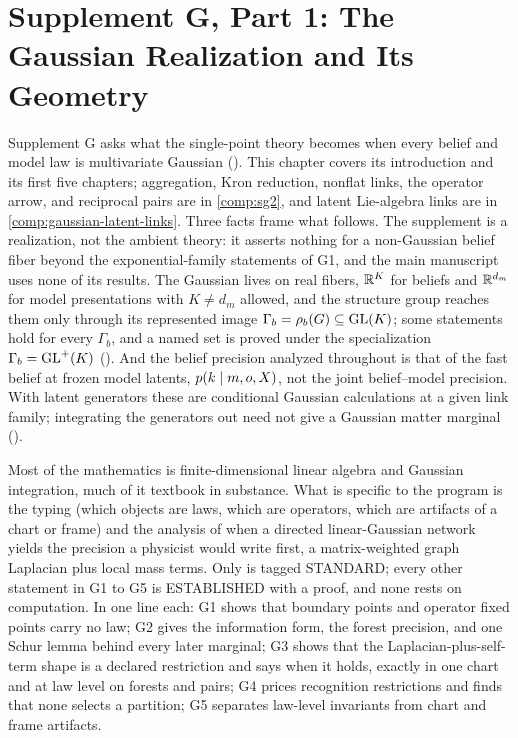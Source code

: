\chapter{Supplement G, Part 1: The Gaussian Realization and Its Geometry}
\label{comp:sg1}

Supplement G asks what the single-point theory becomes when every belief and model law is
multivariate Gaussian (). This chapter covers its introduction and its
first five chapters; aggregation, Kron reduction, nonflat links, the operator arrow, and reciprocal
pairs are in \cref{comp:sg2}, and latent Lie-algebra links are in
\cref{comp:gaussian-latent-links}. Three facts frame what follows. The supplement is a realization, not the
ambient theory: it asserts nothing for a non-Gaussian belief fiber beyond the exponential-family
statements of G1, and the main manuscript uses none of its results. The Gaussian lives on real fibers,
\(\mathbb R^K\) for beliefs and \(\mathbb R^{d_m}\) for model presentations with \(K\neq d_m\) allowed, and the
structure group reaches them only through its represented image \(\Gamma_b=\rho_b(G)\subseteq\mathrm{GL}(K)\);
some statements hold for every \(\Gamma_b\), and a named set is proved under the specialization
\(\Gamma_b=\mathrm{GL}^+(K)\) (). And the belief precision analyzed throughout is
that of the fast belief at frozen model latents, \(p(k\mid m,o,X)\), not the joint belief--model
precision. With latent generators these are conditional Gaussian calculations at a given link
family; integrating the generators out need not give a Gaussian matter marginal
().

Most of the mathematics is finite-dimensional linear algebra and Gaussian integration, much of it
textbook in substance. What is specific to the program is the typing (which objects are laws, which are
operators, which are artifacts of a chart or frame) and the analysis of when a directed linear-Gaussian
network yields the precision a physicist would write first, a matrix-weighted graph Laplacian plus local
mass terms. Only  is tagged STANDARD; every other statement in G1 to G5 is
ESTABLISHED with a proof, and none rests on computation. In one line each: G1 shows that boundary
points and operator fixed points carry no law; G2 gives the information form, the forest precision, and
one Schur lemma behind every later marginal; G3 shows that the Laplacian-plus-self-term shape is a
declared restriction and says when it holds, exactly in one chart and at law level on forests and pairs;
G4 prices recognition restrictions and finds that
none selects a partition; G5 separates law-level invariants from chart and frame artifacts.


